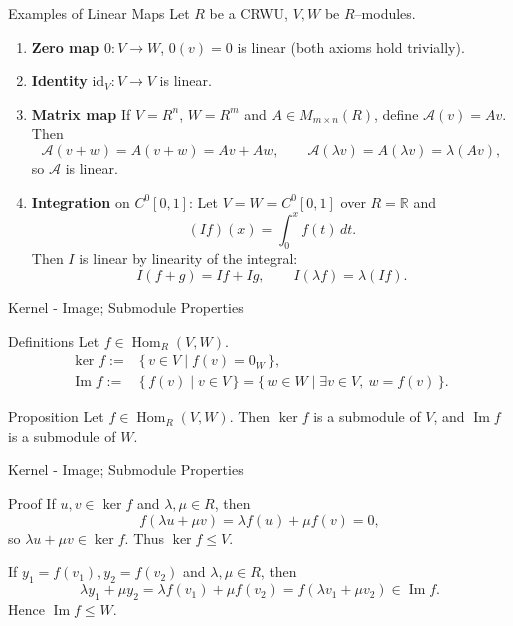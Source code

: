 \documentclass[11pt,aspectratio=43,ignorenonframetext,t]{beamer}
\begin{document}
\begin{frame}{Examples of Linear Maps}
Let $R$ be a CRWU, $V,W$ be $R$–modules.
\begin{enumerate}
  \item \textbf{Zero map} $0:V\to W$, $0(v)=0$ is linear (both axioms hold trivially).
  \item \textbf{Identity} $\mathrm{id}_V:V\to V$ is linear.
  \item \textbf{Matrix map} If $V=R^n$, $W=R^m$ and $A\in M_{m\times n}(R)$, define $\mathcal A(v)=Av$. Then
  \[
  \mathcal A(v+w)=A(v+w)=Av+Aw,\qquad \mathcal A(\lambda v)=A(\lambda v)=\lambda (Av),
  \]
  so $\mathcal A$ is linear.
  \item \textbf{Integration} on $C^0[0,1]$: Let $V=W=C^0[0,1]$ over $R=\mathbb{R}$ and
  \[
  (I f)(x)=\int_0^x f(t)\,dt.
  \]
  Then $I$ is linear by linearity of the integral:
  \[
  I(f+g)=If+Ig,\qquad I(\lambda f)=\lambda (If).
  \]
\end{enumerate}
\end{frame}


\begin{frame}{Kernel - Image; Submodule Properties}

\begin{block}{Definitions}
Let $f\in \operatorname{Hom}_R(V,W)$.
\begin{align*}
    \ker f :=& \{\, v\in V \mid f(v)=0_W \,\}, \\
\operatorname{Im} f :=& \{\, f(v)\mid v\in V \,\} = \{\, w\in W \mid \exists v\in V,\ w=f(v)\,\}.
\end{align*}

\end{block}

\begin{block}{Proposition} Let $f\in \operatorname{Hom}_R(V,W)$. Then
$\ker f$ is a submodule of $V$, and $\operatorname{Im} f$ is a submodule of $W$.
\end{block}


\end{frame}

\begin{frame}{Kernel - Image; Submodule Properties}
\begin{block}{Proof}
If $u,v\in \ker f$ and $\lambda,\mu\in R$, then
\[
f(\lambda u+\mu v)=\lambda f(u)+\mu f(v)=0,
\]
so $\lambda u+\mu v\in\ker f$. Thus $\ker f\le V$.

If $y_1=f(v_1), y_2=f(v_2)$ and $\lambda,\mu\in R$, then
\[
\lambda y_1+\mu y_2=\lambda f(v_1)+\mu f(v_2)=f(\lambda v_1+\mu v_2)\in \operatorname{Im} f.
\]
Hence $\operatorname{Im} f\le W$.
\end{block}
\end{frame}
\end{document}
